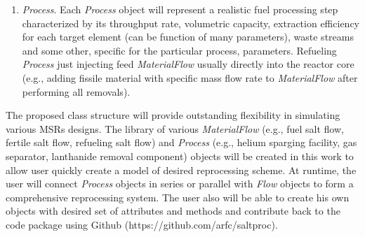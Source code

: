 \begin{enumerate}
	\item \textit{Process}. Each \textit{Process} object will represent a realistic 
	fuel processing step characterized by its throughput rate, volumetric 
	capacity, extraction efficiency for each target element (can be 
	function of many parameters), waste streams 
	and some other, specific for the particular process, parameters. Refueling 
	\textit{Process} just injecting feed \textit{MaterialFlow} usually directly 
	into the reactor core (e.g., adding fissile material with specific mass flow rate 
	to \textit{MaterialFlow} after performing all removals).
\end{enumerate}

The proposed class structure will provide outstanding flexibility in simulating 
various \glspl{MSR} designs. The library of various \textit{MaterialFlow} (e.g., 
fuel salt flow, fertile salt flow, refueling salt flow) and \textit{Process} 
(e.g., helium sparging facility, gas separator, lanthanide removal component) 
objects will be created in this work to allow user quickly create a model of 
desired reprocessing scheme. At runtime, the user will connect \textit{Process} 
objects in series or parallel with \textit{Flow} objects to form a comprehensive 
reprocessing system. The user also will be able to create his own 
objects with desired set of attributes and methods and contribute back to the 
code package using Github (https://github.com/arfc/saltproc).	
	
	

